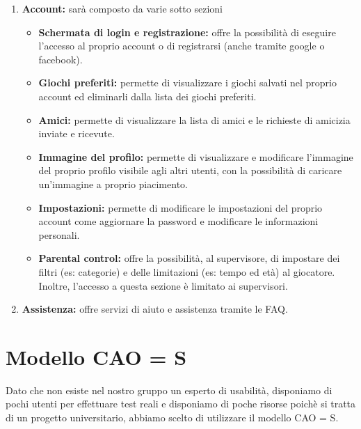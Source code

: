 \documentclass[../Report.tex]{subfiles}
\begin{document}
\begin{enumerate}
        \item \textbf{Account:} sarà composto da varie sotto sezioni
        \begin{itemize}
            \item \textbf{Schermata di login e registrazione:} offre la possibilità di eseguire l'accesso al proprio account o di registrarsi (anche tramite google o facebook).
            \item \textbf{Giochi preferiti:} permette di visualizzare i giochi salvati nel proprio account ed eliminarli dalla lista dei giochi preferiti.
            \item \textbf{Amici:} permette di visualizzare la lista di amici e le richieste di amicizia inviate e ricevute.
            \item \textbf{Immagine del profilo:} permette di visualizzare e modificare l'immagine del proprio profilo visibile agli altri utenti, con la possibilità di caricare un'immagine a proprio piacimento.
            \item \textbf{Impostazioni:} permette di modificare le impostazioni del proprio account come aggiornare la password e modificare le informazioni personali.
            \item \textbf{Parental control:} offre la possibilità, al supervisore, di impostare dei filtri (es: categorie) e delle limitazioni (es: tempo ed età) al giocatore. Inoltre, l'accesso a questa sezione è limitato ai supervisori.
        \end{itemize}
        \item \textbf{Assistenza:} offre servizi di aiuto e assistenza tramite le FAQ.
    \end{enumerate}
    \section{Modello CAO = S}
    \label{section:CAOS}
    Dato che non esiste nel nostro gruppo un esperto di usabilità, disponiamo di pochi utenti per effettuare test reali e disponiamo di poche risorse poichè si tratta di un progetto universitario, abbiamo scelto di utilizzare il modello CAO = S.
\end{document}
